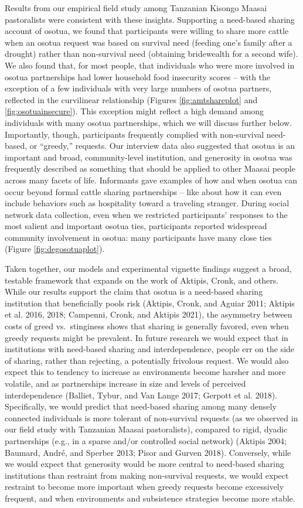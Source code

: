 \documentclass[
]{article}
\begin{document}
Results from our empirical field study among Tanzanian Kisongo Maasai pastoralists were consistent with these insights. Supporting a need-based sharing account of osotua, we found that participants were willing to share more cattle when an osotua request was based on survival need (feeding one's family after a drought) rather than non-survival need (obtaining bridewealth for a second wife). We also found that, for most people, that individuals who were more involved in osotua partnerships had lower household food insecurity scores -- with the exception of a few individuals with very large numbers of osotua partners, reflected in the curvilinear relationship (Figures \ref{fig:amtshareplot} and \ref{fig:osotuainsecure}). This exception might reflect a high demand among individuals with many osotua partnerships, which we will discuss further below. Importantly, though, participants frequently complied with non-survival need-based, or ``greedy,'' requests. Our interview data also suggested that osotua is an important and broad, community-level institution, and generosity in osotua was frequently described as something that should be applied to other Maasai people across many facets of life. Informants gave examples of how and when osotua can occur beyond formal cattle sharing partnerships -- like about how it can even include behaviors such as hospitality toward a traveling stranger. During social network data collection, even when we restricted participants' responses to the most salient and important osotua ties, participants reported widespread community involvement in osotua: many participants have many close ties (Figure \ref{fig:degosotuaplot}).

Taken together, our models and experimental vignette findings suggest a broad, testable framework that expands on the work of Aktipis, Cronk, and others. While our results support the claim that osotua is a need-based sharing institution that beneficially pools risk (Aktipis, Cronk, and Aguiar 2011; Aktipis et al. 2016, 2018; Campenni, Cronk, and Aktipis 2021), the asymmetry between costs of greed vs.~stinginess shows that sharing is generally favored, even when greedy requests might be prevalent. In future research we would expect that in institutions with need-based sharing and interdependence, people err on the side of sharing, rather than rejecting, a potentially frivolous request. We would also expect this to tendency to increase as environments become harsher and more volatile, and as partnerships increase in size and levels of perceived interdependence (Balliet, Tybur, and Van Lange 2017; Gerpott et al. 2018). Specifically, we would predict that need-based sharing among many densely connected individuals is more tolerant of non-survival requests (as we observed in our field study with Tanzanian Maasai pastoralists), compared to rigid, dyadic partnerships (e.g., in a sparse and/or controlled social network) (Aktipis 2004; Baumard, André, and Sperber 2013; Pisor and Gurven 2018). Conversely, while we would expect that generosity would be more central to need-based sharing institutions than restraint from making non-survival requests, we would expect restraint to become more important when greedy requests become excessively frequent, and when environments and subsistence strategies become more stable.
\end{document}
